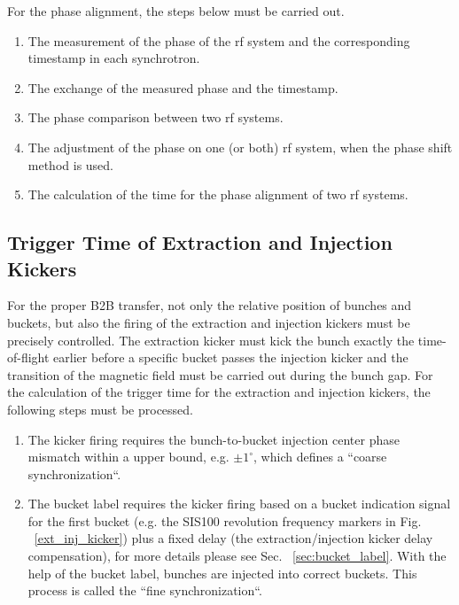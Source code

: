 For the phase alignment, the steps below must be carried out. 
\begin{enumerate}
\item The measurement of the phase of the rf system and the corresponding timestamp in each synchrotron.
\item The exchange of the measured phase and the timestamp.
\item The phase comparison between two rf systems.
\item The adjustment of the phase on one (or both) rf system, when the phase shift method is used. 
\item The calculation of the time for the phase alignment of two rf systems.
\end{enumerate}

\subsection{Trigger Time of Extraction and Injection Kickers}
\label{sec:compensation}
For the proper B2B transfer, not only the relative position of bunches and buckets, but also the firing of the extraction and injection kickers must be precisely controlled. The extraction kicker must kick the bunch exactly the time-of-flight earlier before a specific bucket passes the injection kicker and the transition of the magnetic field must be carried out during the bunch gap. For the calculation of the trigger time for the extraction and injection kickers, the following steps must be processed. 
\begin{enumerate}
\item The kicker firing requires the bunch-to-bucket injection center phase mismatch within a upper bound, e.g. $\pm 1^\circ$, which defines a ``coarse synchronization``.
\item The bucket label requires the kicker firing based on a bucket indication signal for the first bucket (e.g. the SIS100 revolution frequency markers in Fig. ~\ref{ext_inj_kicker}) plus a
fixed delay (the extraction/injection kicker delay compensation), for more details please see Sec. ~\ref{sec:bucket_label}. With the help of the bucket label, bunches are injected into correct buckets. This process is called the ``fine synchronization``.
\end{enumerate}

